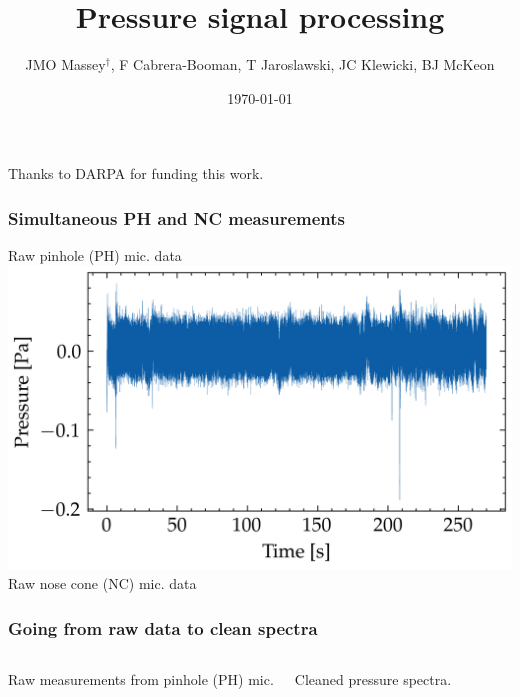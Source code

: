 \documentclass[aspectratio=169,10pt]{beamer}
\title{Pressure signal processing}
\author{JMO Massey$^{\dag}$, F Cabrera-Booman, T Jaroslawski, JC Klewicki, BJ McKeon}
\institute{Center for Turbulence Research \\ Stanford University}
\date{\today}
\begin{document}
\begin{frame}
    \setcounter{framenumber}{0}
    \titlepage
    \vfill
    {\scriptsize \centering Thanks to DARPA for funding this work.\par}
\end{frame}

\begin{frame}
    \frametitle{Simultaneous PH and NC measurements}
    \centering
    Raw pinhole (PH) mic. data
    \includegraphics{../figures/cali_09/PH-NKD/ph_atm.png}
    Raw nose cone (NC) mic. data
\end{frame}

\begin{frame}
  \frametitle{Going from raw data to clean spectra}
  \begin{columns}[c] %
        Raw measurements from pinhole (PH) mic.
    
      \centering
      \scalebox{3}{$\Longrightarrow$}
        Cleaned pressure spectra.
    
  \end{columns}
\end{frame}
\end{document}
